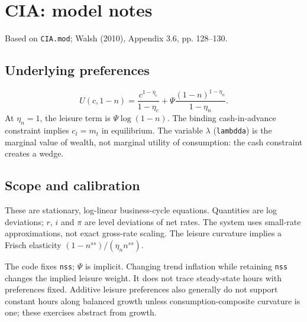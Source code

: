 \documentclass[11pt,a4paper]{article}
\begin{document}
\section*{CIA: model notes}
Based on \texttt{CIA.mod}; Walsh (2010), Appendix 3.6, pp. 128--130.

\subsection*{Underlying preferences}
\[
U(c,1-n)=\frac{c^{1-\eta_c}}{1-\eta_c}
 +\Psi\frac{(1-n)^{1-\eta_n}}{1-\eta_n}.
\]
At $\eta_n=1$, the leisure term is $\Psi\log(1-n)$.
The binding cash-in-advance constraint implies $c_t=m_t$ in equilibrium.
The variable $\lambda$ (\texttt{lambdda}) is the marginal value of wealth,
not marginal utility of consumption: the cash constraint creates a wedge.

\subsection*{Scope and calibration}
These are stationary, log-linear business-cycle equations. Quantities are
log deviations; $r$, $i$ and $\pi$ are level deviations of net rates.
The system uses small-rate approximations, not exact gross-rate scaling.
The leisure curvature implies a Frisch elasticity
$(1-n^{ss})/(\eta_n n^{ss})$.

The code fixes \texttt{nss}; $\Psi$ is implicit. Changing trend inflation
while retaining \texttt{nss} changes the implied leisure weight. It does not
trace steady-state hours with preferences fixed. Additive leisure preferences
also generally do not support constant hours along balanced growth unless
consumption-composite curvature is one; these exercises abstract from growth.
\newpage
\end{document}
